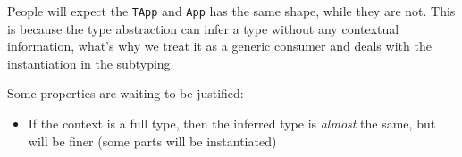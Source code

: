 \documentclass{article}
\begin{document}
People will expect the \texttt{TApp} and \texttt{App} has the same shape, while they are not. This is because the type abstraction can infer a type without any contextual information, what's why we treat it as a generic consumer and deals with the instantiation in the subtyping.

Some properties are waiting to be justified:

\begin{itemize}
	\item If the context is a full type, then the inferred type is \emph{almost} the same, but will be finer (some parts will be instantiated)
\end{itemize}

\end{document}
